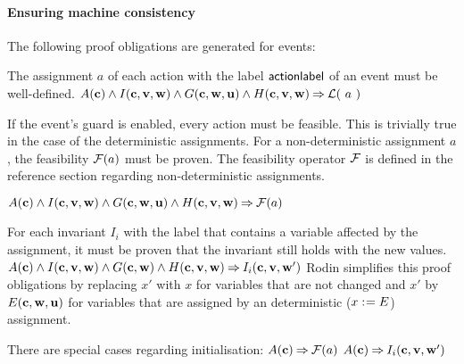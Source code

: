 \paragraph{Ensuring machine consistency}
\label{consistency_proof_obligations}
The following proof obligations are generated for events:

The assignment $a$ of each action with the label $\textsf{actionlabel}$ of an event must be well-defined.
  {}%
  {$A(\mathbf{c}) \land I(\mathbf{c},{\mathbf{v},\mathbf{w}}) \land G(\mathbf{c},\mathbf{w},\mathbf{u}) 
    \land H(\mathbf{c},{\mathbf{v},\mathbf{w}}) \mathbin\Rightarrow \mathcal{L}(~a~)$}
  
If the event's guard is enabled, every action must be feasible.
  This is trivially true in the case of the deterministic assignments.
  For a non-deterministic assignment $a$, the feasibility $\mathcal{F}(a)$ must be proven.
  The feasibility operator $\mathcal{F}$ is defined in the reference
  section regarding non-deterministic assignments.
  
  {$A(\mathbf{c}) \land I(\mathbf{c},{\mathbf{v},\mathbf{w}}) \land G(\mathbf{c},\mathbf{w},\mathbf{u})
    \land H(\mathbf{c},{\mathbf{v},\mathbf{w}}) \mathbin\Rightarrow \mathcal{F}(a)$}

For each invariant $I_i$ with the label  
  that contains a variable affected by the assignment, it must be proven
  that the invariant still holds with the new values.
  {}%
  {$A(\mathbf{c}) \land I(\mathbf{c},{\mathbf{v},\mathbf{w}}) \land G(\mathbf{c},\mathbf{w}) 
    \land H(\mathbf{c},{\mathbf{v},\mathbf{w}}) \mathbin\Rightarrow I_i(\mathbf{c},{\mathbf{v},\mathbf{w}}')$}
  Rodin simplifies this proof obligations by replacing $x'$ with $x$ for variables that are not
  changed and $x'$ by $E(\mathbf{c},\mathbf{w},\mathbf{u})$ 
  for variables that are assigned by an deterministic ($x \mathrel{:\mkern1mu=} E$) assignment.

There are special cases regarding initialisation:
  {$A(\mathbf{c}) \mathbin\Rightarrow  \mathcal{F}(a)$}
  {}%
  {$A(\mathbf{c}) \mathbin\Rightarrow I_i(\mathbf{c},{\mathbf{v},\mathbf{w}}')$}

